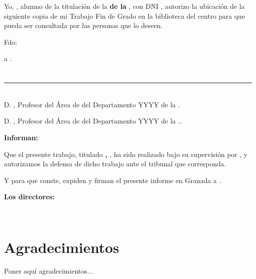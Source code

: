 Yo, \textbf{\myName}, alumno de la titulación \myDegree de la \textbf{\myFaculty de la \myUni}, con DNI \myDNI, autorizo la
ubicación de la siguiente copia de mi Trabajo Fin de Grado en la biblioteca del centro para que pueda ser
consultada por las personas que lo deseen.

\vspace{6cm}

\noindent Fdo: \myName

\vspace{2cm}

\begin{flushright}
\myLocation a \myTime .
\end{flushright}


\chapter*{}
\thispagestyle{empty}

\noindent\rule[-1ex]{\textwidth}{2pt}\\[4.5ex]

D. \textbf{\myProf}, Profesor del Área de \myDepartment del Departamento YYYY de la \myUni.

\vspace{0.5cm}

D. \textbf{\myOtherProf}, Profesor del Área de \myDepartment del Departamento YYYY de la \myUni..


\vspace{0.5cm}

\textbf{Informan:}

\vspace{0.5cm}

Que el presente trabajo, titulado \textit{\textbf{\myTitle, \mySubtitle}},
ha sido realizado bajo su supervisión por \textbf{\myName}, y autorizamos la defensa de dicho trabajo ante el tribunal
que corresponda.

\vspace{0.5cm}

Y para que conste, expiden y firman el presente informe en Granada a \myTime.

\vspace{1cm}

\textbf{Los directores:}

\vspace{5cm}

\noindent \textbf{\myProf \ \ \ \ \ \myOtherProf}

\chapter*{Agradecimientos}
\thispagestyle{empty}

       \vspace{1cm}


Poner aquí agradecimientos...


